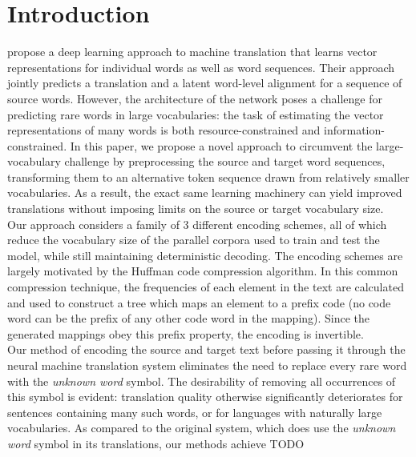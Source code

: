 \section{Introduction}
\label{sec:intro}

 propose a deep learning approach to
machine translation that learns vector representations for individual words as
well as word sequences. Their approach jointly predicts a translation and a
latent word-level alignment for a sequence of source words. However, the architecture of
the network poses a challenge for predicting rare words in large
vocabularies: the task of estimating the vector representations of many words
is both resource-constrained and information-constrained. In this paper, we
propose a novel approach to circumvent the large-vocabulary challenge by preprocessing the source
and target word sequences, transforming them to an alternative token sequence drawn from
relatively smaller vocabularies. As a result, the exact same learning machinery
can yield improved translations without imposing limits on the source or target
vocabulary size.\\

Our approach considers a family of 3 different encoding schemes, all of which
reduce the vocabulary size of the parallel corpora used to train and test the model,
while still maintaining deterministic decoding. The encoding schemes are largely
motivated by the Huffman code compression algorithm. In this common compression technique,
the frequencies of each element in the text are calculated and used to construct a tree
which maps an element to a prefix code (no code word can be the prefix of any other code
word in the mapping). Since the generated mappings obey this prefix property, the
encoding is invertible.\\

Our method of encoding the source and target text before passing it through the
neural machine translation system eliminates the need to replace every rare word with the
\emph{unknown word} symbol. The desirability of removing all occurrences of this symbol is evident: translation
quality otherwise significantly deteriorates for sentences containing many such words, or for
languages with naturally large vocabularies. As compared to the original system, which does use
the \emph{unknown word} symbol in its translations, our methods achieve TODO\\